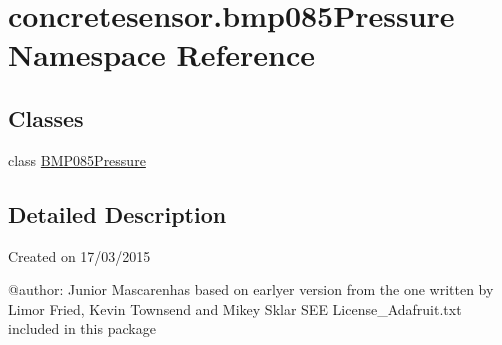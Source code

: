 \hypertarget{namespaceconcretesensor_1_1bmp085Pressure}{}\section{concretesensor.\+bmp085\+Pressure Namespace Reference}
\label{namespaceconcretesensor_1_1bmp085Pressure}
\subsection*{Classes}
\begin{DoxyCompactItemize}
\item 
class \hyperlink{classconcretesensor_1_1bmp085Pressure_1_1BMP085Pressure}{B\+M\+P085\+Pressure}
\end{DoxyCompactItemize}


\subsection{Detailed Description}
\begin{DoxyVerb}Created on 17/03/2015

@author: Junior Mascarenhas
based on earlyer version from
the one written by Limor Fried, Kevin Townsend and Mikey Sklar
SEE License_Adafruit.txt included in this package
\end{DoxyVerb}
 